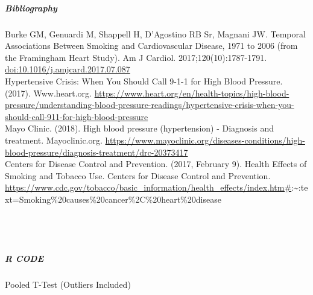 \documentclass[
]{article}
\begin{document}
\hypertarget{bibliography}{%
\subparagraph{Bibliography}\label{bibliography}}

Burke GM, Genuardi M, Shappell H, D'Agostino RB Sr, Magnani JW. Temporal
Associations Between Smoking and Cardiovascular Disease, 1971 to 2006
(from the Framingham Heart Study). Am J Cardiol. 2017;120(10):1787-1791.
\url{doi:10.1016/j.amjcard.2017.07.087}\\

Hypertensive Crisis: When You Should Call 9-1-1 for High Blood Pressure.
(2017). Www.heart.org.
\url{https://www.heart.org/en/health-topics/high-blood-pressure/understanding-blood-pressure-readings/hypertensive-crisis-when-you-should-call-911-for-high-blood-pressure}\\

Mayo Clinic. (2018). High blood pressure (hypertension) - Diagnosis and
treatment. Mayoclinic.org.
\url{https://www.mayoclinic.org/diseases-conditions/high-blood-pressure/diagnosis-treatment/drc-20373417}\\

Centers for Disease Control and Prevention. (2017, February 9). Health
Effects of Smoking and Tobacco Use. Centers for Disease Control and
Prevention.
\url{https://www.cdc.gov/tobacco/basic_information/health_effects/index.htm\#}:\textasciitilde:text=Smoking\%20causes\%20cancer\%2C\%20heart\%20disease\\
~\\
~\\
~\\

\hypertarget{r-code}{%
\subparagraph{\texorpdfstring{\textbf{R CODE}}{R CODE}}\label{r-code}}

Pooled T-Test (Outliers Included)
\end{document}
